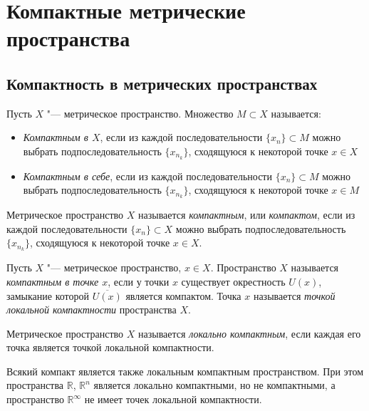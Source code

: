\section{Компактные метрические пространства}

\subsection{Компактность в метрических пространствах}

\begin{definition}
Пусть $X$ "--- метрическое пространство. Множество $M \subset X$ называется:
    \begin{itemize}
        \item \textit{Компактным в $X$}, если из каждой последовательности $\{x_n\} \subset M$ можно выбрать подпоследовательность $\{x_{n_k}\}$, сходящуюся к некоторой точке $x \in X$
        \item \textit{Компактным в себе}, если из каждой последовательности $\{x_n\} \subset M$ можно выбрать подпоследовательность $\{x_{n_k}\}$, сходящуюся к некоторой точке $x \in M$
    \end{itemize}
\end{definition}

\begin{definition}
    Метрическое пространство $X$ называется \textit{компактным}, или \textit{компактом}, если из каждой последовательности $\{x_n\} \subset X$ можно выбрать подпоследовательность $\{x_{n_k}\}$, сходящуюся к некоторой точке $x \in X$.
\end{definition}

\begin{definition}
    Пусть $X$ "--- метрическое пространство, $x \in X$. Пространство $X$ называется \textit{компактным в точке $x$}, если у точки $x$ существует окрестность $U(x)$, замыкание которой $\overline{U(x)}$ является компактом. Точка $x$ называется \textit{точкой локальной компактности} пространства $X$.
\end{definition}

\begin{definition}
    Метрическое пространство $X$ называется \textit{локально компактным}, если каждая его точка является точкой локальной компактности.
\end{definition}

\begin{note}
    Всякий компакт является также локальным компактным пространством. При этом пространства $\mathbb R$, $\mathbb R^n$ является локально компактными, но не компактными, а пространство $\mathbb R^{\infty}$ не имеет точек локальной компактности.
\end{note}

